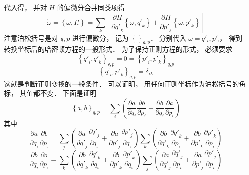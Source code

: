 代入得， 并对 $H$ 的偏微分合并同类项得
  \begin{equation}
  \dot \omega  = \left\{ {\omega ,H} \right\} = \sum\limits_k {\left[ {\frac{{\partial H}}{{\partial {{q'}_k}}}\left\{ {\omega ,{{q'}_k}} \right\} + \frac{{\partial H}}{{\partial {{p'}_k}}}\left\{ {\omega ,{{p'}_k}} \right\}} \right]} 
\end{equation}
注意泊松括号是对 $q,p$ 进行偏微分， 记为 ${\left\{ {} \right\}_{q,p}}$．  分别代入 $\omega  = {q'_i},{p'_i}$，  得到转换坐标后的哈密顿方程的一般形式． 为了保持正则方程的形式， 必须要求
  \begin{equation}
{\left\{ {{{q'}_i},{{q'}_k}} \right\}_{q,p}} = 0 = {\left\{ {{{p'}_i},{{p'}_k}} \right\}_{q,p}}
\end{equation}
  \begin{equation}
{\left\{ {{{q'}_i},{{p'}_k}} \right\}_{q,p}} = {\delta _{ik}}
\end{equation}
这就是判断正则变换的一般条件． 可以证明， 用任何正则坐标作为泊松括号的角标， 其值都不变． 下面是证明
  \begin{equation}
{\left\{ {a,b} \right\}_{q,p}} = \sum\limits_i {\left( {\frac{{\partial a}}{{\partial {q_i}}}\frac{{\partial b}}{{\partial {p_i}}} - \frac{{\partial b}}{{\partial {q_i}}}\frac{{\partial a}}{{\partial {p_i}}}} \right)} 
\end{equation}
其中
  \begin{equation}
\frac{{\partial a}}{{\partial {q_i}}}\frac{{\partial b}}{{\partial {p_i}}} = \sum\limits_j {\left( {\frac{{\partial a}}{{\partial {{q'}_j}}}\frac{{\partial {{q'}_j}}}{{\partial {q_i}}} + \frac{{\partial a}}{{\partial {{p'}_j}}}\frac{{\partial {{p'}_j}}}{{\partial {q_i}}}} \right)} \sum\limits_k {\left( {\frac{{\partial b}}{{\partial {{q'}_k}}}\frac{{\partial {{q'}_k}}}{{\partial {p_i}}} + \frac{{\partial b}}{{\partial {{p'}_k}}}\frac{{\partial {{p'}_k}}}{{\partial {p_i}}}} \right)} 
\end{equation}
 \begin{equation}
\frac{{\partial b}}{{\partial {q_i}}}\frac{{\partial a}}{{\partial {p_i}}} = \sum\limits_k {\left( {\frac{{\partial b}}{{\partial {{q'}_k}}}\frac{{\partial {{q'}_k}}}{{\partial {q_i}}} + \frac{{\partial b}}{{\partial {{p'}_k}}}\frac{{\partial {{p'}_k}}}{{\partial {q_i}}}} \right)} \sum\limits_j {\left( {\frac{{\partial a}}{{\partial {{q'}_j}}}\frac{{\partial {{q'}_j}}}{{\partial {p_i}}} + \frac{{\partial a}}{{\partial {{p'}_j}}}\frac{{\partial {{p'}_j}}}{{\partial {p_i}}}} \right)} 
\end{equation}
 
